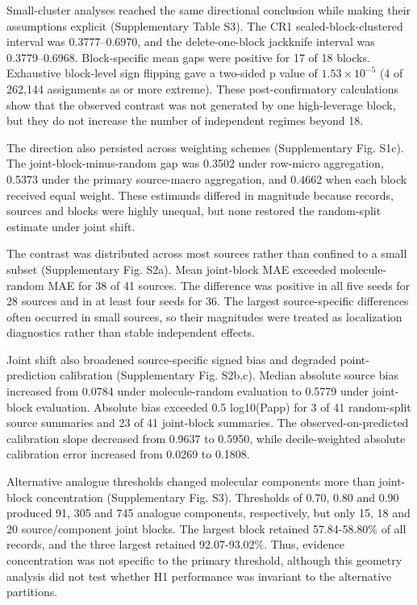 \documentclass[referee,lineno,pdflatex,sn-vancouver-num]{sn-jnl}
\begin{document}
Small-cluster analyses reached the same directional conclusion while making their assumptions explicit (Supplementary Table S3). The CR1 sealed-block-clustered interval was 0.3777--0.6970, and the delete-one-block jackknife interval was 0.3779--0.6968. Block-specific mean gaps were positive for 17 of 18 blocks. Exhaustive block-level sign flipping gave a two-sided p value of $1.53 \times 10^{-5}$ (4 of 262,144 assignments as or more extreme). These post-confirmatory calculations show that the observed contrast was not generated by one high-leverage block, but they do not increase the number of independent regimes beyond 18.

The direction also persisted across weighting schemes (Supplementary Fig. S1c). The joint-block-minus-random gap was 0.3502 under row-micro aggregation, 0.5373 under the primary source-macro aggregation, and 0.4662 when each block received equal weight. These estimands differed in magnitude because records, sources and blocks were highly unequal, but none restored the random-split estimate under joint shift.

The contrast was distributed across most sources rather than confined to a small subset (Supplementary Fig. S2a). Mean joint-block MAE exceeded molecule-random MAE for 38 of 41 sources. The difference was positive in all five seeds for 28 sources and in at least four seeds for 36. The largest source-specific differences often occurred in small sources, so their magnitudes were treated as localization diagnostics rather than stable independent effects.

Joint shift also broadened source-specific signed bias and degraded point-prediction calibration (Supplementary Fig. S2b,c). Median absolute source bias increased from 0.0784 under molecule-random evaluation to 0.5779 under joint-block evaluation. Absolute bias exceeded 0.5 log10(Papp) for 3 of 41 random-split source summaries and 23 of 41 joint-block summaries. The observed-on-predicted calibration slope decreased from 0.9637 to 0.5950, while decile-weighted absolute calibration error increased from 0.0269 to 0.1808.

Alternative analogue thresholds changed molecular components more than joint-block concentration (Supplementary Fig. S3). Thresholds of 0.70, 0.80 and 0.90 produced 91, 305 and 745 analogue components, respectively, but only 15, 18 and 20 source/component joint blocks. The largest block retained 57.84-58.80\% of all records, and the three largest retained 92.07-93.02\%. Thus, evidence concentration was not specific to the primary threshold, although this geometry analysis did not test whether H1 performance was invariant to the alternative partitions.
\end{document}
